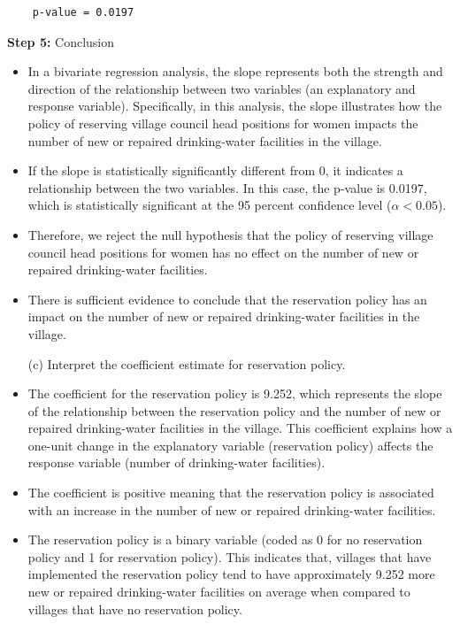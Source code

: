 \documentclass[12pt,letterpaper]{article}
\begin{document}
\begin{verbatim}
	p-value = 0.0197
\end{verbatim}
\vspace{.5cm}
\noindent\textbf{Step 5:} Conclusion 
\begin{itemize}
	\item 
	In a bivariate regression analysis, the slope represents both the strength and direction of the relationship between two variables (an explanatory and response variable). Specifically, in this analysis, the slope illustrates how the policy of reserving village council head positions for women impacts the number of new or repaired drinking-water facilities in the village.
	\item
	If the slope is statistically significantly different from 0, it indicates a relationship between the two variables. In this case, the p-value is 0.0197, which is statistically significant at the 95 percent confidence level ($\alpha < 0.05$).
	\item 
	Therefore, we reject the null hypothesis that the policy of reserving village council head positions for women has no effect on the number of new or repaired drinking-water facilities.
	\item 
	There is sufficient evidence to conclude that the reservation policy has an impact on the number of new or repaired drinking-water facilities in the village.
\end{itemize}

\newpage
\begin{enumerate}
	\item [(c)] Interpret the coefficient estimate for reservation policy. 
\end{enumerate}
\vspace{0.5cm}
\begin{itemize}
	\item 
	The coefficient for the reservation policy is 9.252, which represents the slope of the relationship between the reservation policy and the number of new or repaired drinking-water facilities in the village. This coefficient explains how a one-unit change in the explanatory variable (reservation policy) affects the response variable (number of drinking-water facilities).
	\item
	The coefficient is positive meaning that the reservation policy is associated with an increase in the number of new or repaired drinking-water facilities.
	\item
	The reservation policy is a binary variable (coded as 0 for no reservation policy and 1 for reservation policy). This indicates that, villages that have implemented the reservation policy tend to have approximately 9.252 more new or repaired drinking-water facilities on average when compared to villages that have no reservation policy. 
\end{itemize}
\end{document}
